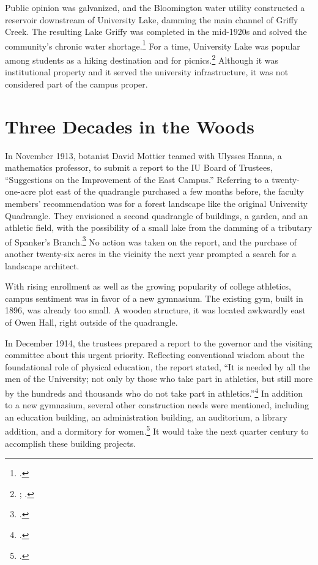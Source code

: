 \documentclass[
  american,
  letterpaper,
]{scrreprt}
\begin{document}
Public opinion was galvanized, and the Bloomington water utility
constructed a reservoir downstream of University Lake, damming the main
channel of Griffy Creek. The resulting Lake Griffy was completed in the
mid-1920s and solved the community's chronic water shortage.\footnote{.} For a time, University Lake was popular among students as a
hiking destination and for picnics.\footnote{; .} Although it was institutional property and it served
the university infrastructure, it was not considered part of the campus
proper.

\section{Three Decades in the Woods}\label{three-decades-in-the-woods}

In November 1913, botanist David Mottier teamed with Ulysses Hanna, a
mathematics professor, to submit a report to the IU Board of Trustees,
``Suggestions on the Improvement of the East Campus.'' Referring to a
twenty-one-acre plot east of the quadrangle purchased a few months
before, the faculty members' recommendation was for a forest landscape
like the original University Quadrangle. They envisioned a second
quadrangle of buildings, a garden, and an athletic field, with the
possibility of a small lake from the damming of a tributary of Spanker's
Branch.\footnote{.} No action was taken on the
report, and the purchase of another twenty-six acres in the vicinity the
next year prompted a search for a landscape architect.

With rising enrollment as well as the growing popularity of college
athletics, campus sentiment was in favor of a new gymnasium. The
existing gym, built in 1896, was already too small. A wooden structure,
it was located awkwardly east of Owen Hall, right outside of the
quadrangle.

In December 1914, the trustees prepared a report to the governor and the
visiting committee about this urgent priority. Reflecting conventional
wisdom about the foundational role of physical education, the report
stated, ``It is needed by all the men of the University; not only by
those who take part in athletics, but still more by the hundreds and
thousands who do not take part in athletics.''\footnote{.} In addition to a
new gymnasium, several other construction needs were mentioned,
including an education building, an administration building, an
auditorium, a library addition, and a dormitory for women.\footnote{.} It would take the next quarter century to accomplish these
building projects.
\end{document}
